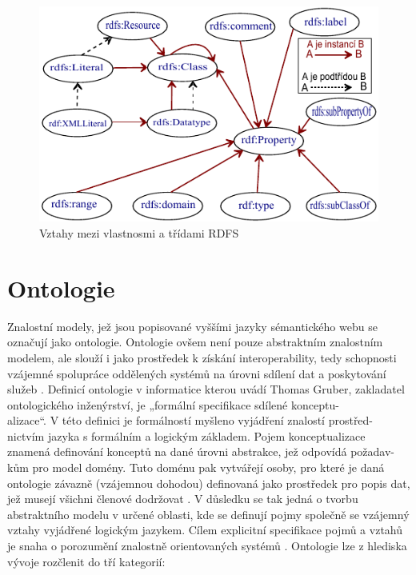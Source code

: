 \documentclass{projekt}
\begin{document}
\begin{figure}[htb]
\begin{center}
\includegraphics[scale=1.4]{rdfs.pdf}
\caption{Vztahy mezi vlastnosmi a třídami RDFS}
\end{center}
\end{figure}

\section{Ontologie}
\hspace{0.65cm}Znalostní modely, jež jsou popisované vyššími jazyky sémantického webu se označují jako ontologie. Ontologie ovšem není pouze abstraktním znalostním modelem, ale slouží i jako prostředek k získání interoperability, tedy schopnosti vzájemné spolupráce oddělených systémů na úrovni sdílení dat a poskytování služeb \cite{_2}. Definicí ontologie v informatice kterou uvádí Thomas Gruber, zakladatel ontologického inženýrství, je „formální specifikace sdílené konceptu-\\alizace“\cite{_8}. V této definici je formálností myšleno vyjádření znalostí prostřed-\\nictvím jazyka s formálním a logickým základem. Pojem konceptualizace znamená definování konceptů na dané úrovni abstrakce, jež odpovídá požadav-\\kům pro model domény. Tuto doménu pak vytvářejí osoby, pro které je daná ontologie závazně (vzájemnou dohodou) definovaná jako prostředek pro popis dat, jež musejí všichni členové dodržovat \cite{_2}. V důsledku se tak jedná o tvorbu abstraktního modelu v určené oblasti, kde se definují pojmy společně se vzájemný vztahy vyjádřené logickým jazykem. Cílem explicitní specifikace pojmů a vztahů je snaha o porozumění znalostně orientovaných systémů \cite{_9}.
Ontologie lze z hlediska vývoje rozčlenit do tří kategorií:
\end{document}
